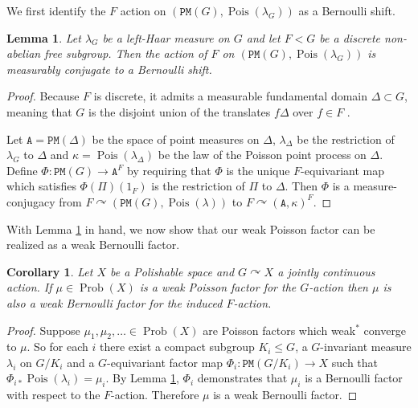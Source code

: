 \documentclass[11pt]{amsart}
\newtheorem{lemma}[theorem]{Lemma}
\newtheorem{corollary}[theorem]{Corollary}
\theoremstyle{definition}
\theoremstyle{remark}
\newcommand{\cP}{\mathtt{PM}}
\newcommand{\Pois}{\operatorname{Pois}}
\newcommand{\Prob}{\operatorname{Prob}}
\def\cc{{\curvearrowright}}
\begin{document}
We first identify the $F$ action on $(\cP(G),\Pois(\lambda_G))$ as a Bernoulli shift. 



\begin{lemma}\label{lem:mc-to-Bernoulli-shift}
Let $\lambda_G$ be a left-Haar measure on $G$ and let $F < G$ be a discrete non-abelian free subgroup. Then the action of $F$ on $(\cP(G), \Pois(\lambda_G))$ is measurably conjugate to a Bernoulli shift.   
\end{lemma}

\begin{proof}
  Because $F$ is discrete, it admits a measurable fundamental domain $\Delta \subset G$, meaning that $G$ is the disjoint union of the translates $f\Delta$ over $f\in F$ \cite[Lemma 4.1.1]{MR3307755}. 

    Let $\mathtt{A}=\cP(\Delta)$ be the space of point measures on $\Delta$, $\lambda_\Delta$ be the restriction of $\lambda_G$ to $\Delta$ and $\kappa=\Pois(\lambda_\Delta)$ be the law of the Poisson point process on $\Delta$. Define $\Phi:\cP(G)\to \mathtt{A}^F$ by requiring that $\Phi$ is the unique $F$-equivariant map which satisfies $\Phi(\Pi)(1_F)$ is the restriction of $\Pi$ to $\Delta$. Then $\Phi$ is a measure-conjugacy from $F \cc (\cP(G),\Pois(\lambda))$ to $F \cc (\mathtt{A},\kappa)^F$.
        \end{proof}



With Lemma \ref{lem:mc-to-Bernoulli-shift} in hand, we now show that our weak Poisson factor can be realized as a weak Bernoulli factor.

\begin{corollary}\label{C:reductiontofree}
Let $X$ be a Polishable space and $G \cc X$ a jointly continuous action.    If $\mu \in \Prob(X)$ is a weak Poisson factor for the $G$-action then $\mu$ is also a weak Bernoulli factor for the induced $F$-action. 
\end{corollary}

\begin{proof}
Suppose $\mu_1,\mu_2,\ldots \in \Prob(X)$ are Poisson factors 
which weak$^*$ converge to $\mu$. So for each $i$ there exist a compact subgroup $K_i \le G$, a $G$-invariant measure $\lambda_i$ on $G/K_i$ and a $G$-equivariant factor map $\Phi_i:\cP(G/K_i) \to X$ such that $\Phi_{i*}\Pois(\lambda_i) = \mu_i$. By Lemma \ref{lem:mc-to-Bernoulli-shift}, $\Phi_i$ demonstrates that $\mu_i$ is a Bernoulli factor with respect to the $F$-action. Therefore $\mu$ is a weak Bernoulli factor.
\end{proof}
\end{document}
